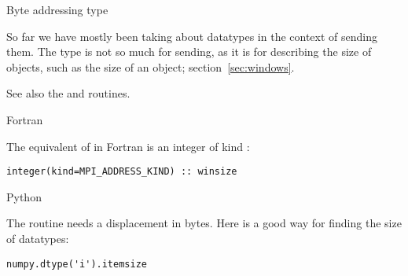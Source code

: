  {Byte addressing type}

So far we have mostly been taking about datatypes in the context of
sending them. The  type is not so much for
sending, as it is for describing the size of objects, such as the size
of an  object; section~\ref{sec:windows}.

See also the  and
 routines.

 {Fortran}

The equivalent of
 in Fortran
is an integer of kind :
\lstset{style=reviewcode,language=Fortran} %
\begin{lstlisting}
integer(kind=MPI_ADDRESS_KIND) :: winsize
\end{lstlisting}
\lstset{style=reviewcode,language=C} %

 {Python}

The  routine needs a displacement in
bytes. Here is a good way for finding the size of  datatypes:
\lstset{style=reviewcode,language=Python} %
\begin{lstlisting}
numpy.dtype('i').itemsize
\end{lstlisting}
\lstset{language=C} %


